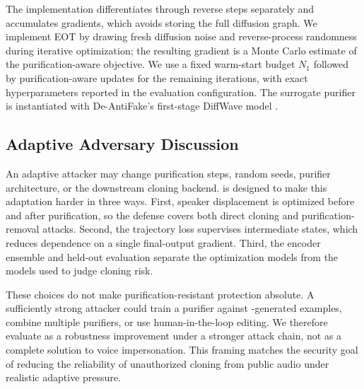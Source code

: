 The implementation differentiates through reverse steps separately and accumulates gradients, 
which avoids storing the full diffusion graph. We implement EOT by drawing fresh diffusion noise and reverse-process randomness during iterative optimization; 
the resulting gradient is a Monte Carlo estimate of the purification-aware objective. 
We use a fixed warm-start budget $N_1$ followed by purification-aware updates for the remaining iterations, with exact hyperparameters reported in the evaluation configuration. 
The surrogate purifier is instantiated with De-AntiFake's first-stage DiffWave model \cite{fan2025deantifake,kong2021diffwave}.

\subsection{Adaptive Adversary Discussion}

An adaptive attacker may change purification steps, random seeds, purifier architecture, or the downstream cloning backend. 
\method{} is designed to make this adaptation harder in three ways. 
First, speaker displacement is optimized before and after purification, so the defense covers both direct cloning and purification-removal attacks. 
Second, the trajectory loss supervises intermediate states, which reduces dependence on a single final-output gradient. 
Third, the encoder ensemble and held-out evaluation separate the optimization models from the models used to judge cloning risk.

These choices do not make purification-resistant protection absolute. A sufficiently strong attacker could train a purifier against \method-generated examples, combine multiple purifiers, or use human-in-the-loop editing. 
We therefore evaluate \method{} as a robustness improvement under a stronger attack chain, not as a complete solution to voice impersonation. 
This framing matches the security goal of reducing the reliability of unauthorized cloning from public audio under realistic adaptive pressure.
